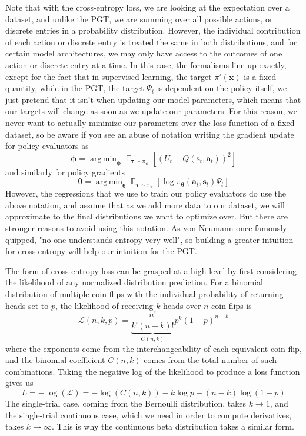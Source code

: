 \documentclass{article}
\DeclareMathOperator*{\argmin}{arg\,min}
\begin{document}
Note that with the cross-entropy loss, we are looking at the expectation over a dataset, and unlike the PGT, we are summing over all possible actions, or discrete entries in a probability distribution. However, the individual contribution of each action or discrete entry is treated the same in both distributions, and for certain model architectures, we may only have access to the outcomes of one action or discrete entry at a time. In this case, the formalisms line up exactly, except for the fact that in supervised learning, the target $\pi'(\mathbf{x})$ is a fixed quantity, while in the PGT, the target $\Psi_t$ is dependent on the policy itself, we just pretend that it isn't when updating our model parameters, which means that our targets will change as soon as we update our parameters. For this reason, we never want to actually minimize our parameters over the loss function of a fixed dataset, so be aware if you see an abuse of notation writing the gradient update for policy evaluators as \begin{equation}\boldsymbol{\phi}=\argmin_{\boldsymbol{\phi}}\mathop{\mathbb{E}}_{\boldsymbol{\tau}\sim\pi_{\boldsymbol{\phi}}}\left[\left(U_t-Q(\mathbf{s}_t,\mathbf{a}_t)\right)^2\right]\end{equation} and similarly for policy gradients \begin{equation}\boldsymbol{\theta}=\argmin_{\boldsymbol{\theta}}\mathop{\mathbb{E}}_{\boldsymbol{\tau}\sim\pi_{\boldsymbol{\theta}}}\left[\log\pi_{\boldsymbol{\theta}}(\mathbf{a}_t,\mathbf{s}_t)\Psi_t\right]\end{equation}
However, the regressions that we use to train our policy evaluators do use the above notation, and assume that as we add more data to our dataset, we will approximate to the final distributions we want to optimize over. But there are stronger reasons to avoid using this notation. As von Neumann once famously quipped, "no one understands entropy very well"\cite{no_one_understands_entropy}, so building a greater intuition for cross-entropy will help our intuition for the PGT.  

The form of cross-entropy loss can be grasped at a high level by first considering the likelihood of any normalized distribution prediction. For a binomial distribution of multiple coin flips with the individual probability of returning heads set to $p$, the likelihood of receiving $k$ heads over $n$ coin flips is \begin{equation}\mathcal{L}(n,k,p)=\underbrace{\frac{n!}{k!(n-k)!}}_{C(n,k)}p^k(1-p)^{n-k}\end{equation}where the exponents come from the interchangeability of each equivalent coin flip, and the binomial coefficient $C(n,k)$ comes from the total number of such combinations. Taking the negative log of the likelihood to produce a loss function gives us \begin{equation}L=-\log(\mathcal{L})=-\log(C(n,k))-k\log p -(n-k)\log (1-p)\end{equation}The single-trial case, coming from the Bernoulli distribution, takes $k\rightarrow 1$, and the single-trial continuous case, which we need in order to compute derivatives, takes $k\rightarrow \infty$. This is why the continuous beta distribution takes a similar form.
\end{document}

